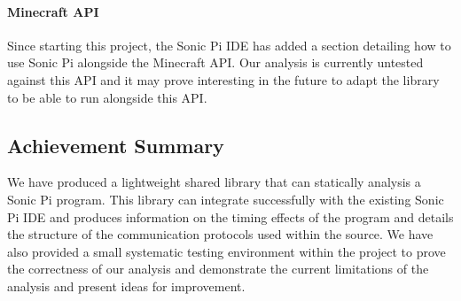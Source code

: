 \documentclass[11pt, abstracton, twoside, titlepage=true]{scrartcl}
\begin{document}
\paragraph{Minecraft API}
Since starting this project, the Sonic Pi IDE has added a section detailing how 
to use Sonic Pi alongside the Minecraft API. Our analysis is currently untested 
against this API and it may prove interesting in the future to adapt the library 
to be able to run alongside this API. 

\subsection{Achievement Summary}
We have produced a lightweight shared library that can statically analysis a 
Sonic Pi program. This library can integrate successfully with the existing 
Sonic Pi IDE and produces information on the timing effects of the program and 
details the structure of the communication protocols used within the source. We 
have also provided a small systematic testing environment within the project 
to prove the correctness of our analysis and demonstrate the current limitations 
of the analysis and present ideas for improvement.

\newpage
\end{document}
